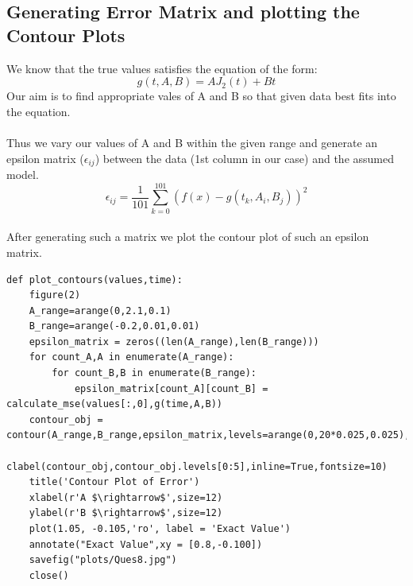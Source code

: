 \documentclass[11pt, a4paper]{article}
\begin{document}
\subsection{Generating Error Matrix and plotting the Contour Plots}
We know that the true values satisfies the equation of the form:\\
\begin{equation*}
g(t,A,B) = AJ_{2}(t)+Bt 
\end{equation*}
Our aim is to find appropriate vales of A and B so that given data best fits into the equation.\\\\Thus we vary our values of A and B within the given range and generate an epsilon matrix ($\epsilon_{ij}$) between the data (1st column in our case) and the assumed model. 
\begin{equation}
    \epsilon_{ij} =  \frac{1}{101}\sum_{k=0}^{101}(f(x)-g(t_k,A_i,B_j))^2
\end{equation} \\
After generating such a matrix we plot the contour plot of such an epsilon matrix. \\
\begin{lstlisting}
def plot_contours(values,time):
    figure(2)
    A_range=arange(0,2.1,0.1)
    B_range=arange(-0.2,0.01,0.01)
    epsilon_matrix = zeros((len(A_range),len(B_range)))
    for count_A,A in enumerate(A_range):
        for count_B,B in enumerate(B_range):
            epsilon_matrix[count_A][count_B] = calculate_mse(values[:,0],g(time,A,B))
    contour_obj = contour(A_range,B_range,epsilon_matrix,levels=arange(0,20*0.025,0.025),cmap="magma")
    clabel(contour_obj,contour_obj.levels[0:5],inline=True,fontsize=10)
    title('Contour Plot of Error')
    xlabel(r'A $\rightarrow$',size=12)
    ylabel(r'B $\rightarrow$',size=12)
    plot(1.05, -0.105,'ro', label = 'Exact Value')
    annotate("Exact Value",xy = [0.8,-0.100])
    savefig("plots/Ques8.jpg")
    close()

\end{lstlisting}
\end{document}
